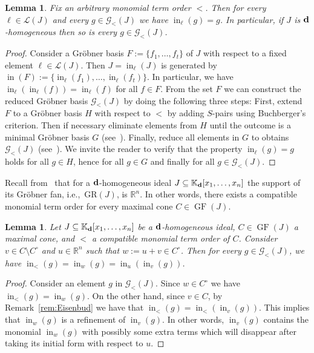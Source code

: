 \documentclass[pdftex]{sigma}%
\newtheorem{Lemma}[Theorem]{Lemma}
\numberwithin{equation}{section}
\DeclareMathOperator{\init}{in}
\DeclareMathOperator{\GF}{GF}
\begin{document}
\begin{Lemma}
Fix an arbitrary monomial term order $<$. Then for every $\ell \in \mathcal L(J)$ and every $g\in \mathcal G_<(J)$ we have $\init_\ell(g)=g$.
In particular, if $J$ is ${\bf d}$-homogeneous then so is every $g\in \mathcal G_<(J)$.
\end{Lemma}
\begin{proof}
Consider a Gr\"obner basis $F:=\{f_1,\dots,f_t\}$ of $J$ with respect to a fixed element \mbox{$\ell\in\mathcal L(J)$}.
Then $J=\init_{\ell}(J)$ is generated by $\init(F):=\{\init_{\ell}(f_1),\dots,\init_\ell(f_t)\}$.
In particular, we have $\init_{\ell}(\init_{\ell}(f))=\init_\ell(f)$ for all $f\in F$.
From the set $F$ we can construct the reduced Gr\"obner basis $\mathcal G_<(J)$ by doing the following three steps:
First, extend $F$ to a Gr\"obner basis $H$ with res\-pect to $<$ by adding $S$-pairs using Buchberger's criterion.
Then if necessary eliminate elements from $H$ until the outcome is a minimal Gr\"obner basis $G$ (see~\cite[Corollary 1.8.3]{loustaunau1994introduction}).
Finally, reduce all elements in $G$ to obtains $\mathcal G_<(J)$ (see~\cite[Corollary 1.8.6]{loustaunau1994introduction}).
We invite the reader to verify that the property $\init_\ell(g)=g$ holds for all $g\in H$, hence for all $g\in G$ and finally for all $g\in \mathcal G_<(J)$.
\end{proof}

Recall from~\cite[Corollary 5.7]{mora1988grobner} that for a ${\bf d}$-homogeneous ideal $J\subseteq \mathbb K_{\bf d}[x_1, \dots , x_n]$ the support of its Gr\"obner fan, i.e.,~$\text{GR}(J)$, is $\mathbb R^n$. In other words, there exists a compatible monomial term order for every maximal cone $C\in \GF(J)$.

\begin{Lemma}
Let $J\subseteq \mathbb K_{\bf d}[x_1, \dots , x_n]$ be a ${\bf d}$-homogeneous ideal, $C\in\GF(J)$ a maximal cone, and $<$ a compatible monomial term order of $C$.
Consider $v\in C\setminus C^\circ$ and $u\in\mathbb{R}^n$ such that $w:=u+v\in C^\circ$. Then for every $g\in\mathcal{G}_<(J)$, we have $\init_<(g)=\init_{w}(g)=\init_u(\init_v(g))$.
\end{Lemma}
\begin{proof}
Consider an element $g$ in $\mathcal{G}_<(J)$. Since $w\in C^\circ$ we have $\init_<(g)=\init_{w}(g)$. On the other hand, since $v\in C$, by Remark~\ref{rem:Eisenbud} we have that $\init_<(g)=\init_{<}(\init_{v}(g))$.
This implies that $\init_{w}(g)$ is a refinement of $\init_{v}(g)$.
In other words, $\init_{v}(g)$ contains the monomial $\init_{w}(g)$ with possibly some extra terms which will disappear after taking its initial form with respect to $u$.
\end{proof}
\end{document}
